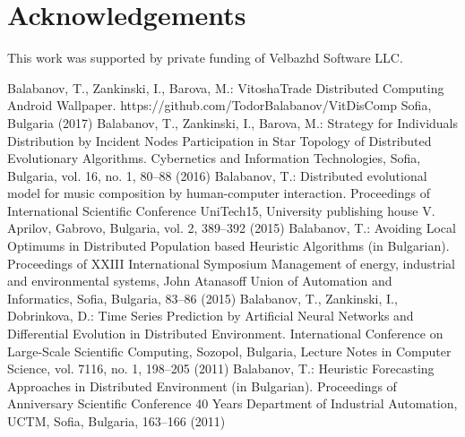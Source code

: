 \documentclass{llncs}
\begin{document}
\section*{Acknowledgements}
%
This work was supported by private funding of Velbazhd Software LLC.
%
%
\begin{thebibliography}{}
%
Balabanov, T., Zankinski, I., Barova, M.:
VitoshaTrade Distributed Computing Android Wallpaper.
https://github.com/TodorBalabanov/VitDisComp Sofia, Bulgaria  (2017)
%
Balabanov, T., Zankinski, I., Barova, M.:
Strategy for Individuals Distribution by Incident Nodes Participation in Star Topology of Distributed Evolutionary Algorithms.
Cybernetics and Information Technologies, Sofia, Bulgaria, vol. 16, no. 1, 80--88  (2016)
%
Balabanov, T.:
Distributed evolutional model for music composition by human-computer interaction.
Proceedings of International Scientific Conference UniTech15, University publishing house V. Aprilov, Gabrovo, Bulgaria, vol. 2, 389--392 (2015)
%
Balabanov, T.:
Avoiding Local Optimums in Distributed Population based Heuristic Algorithms (in Bulgarian).
Proceedings of XXIII International Symposium Management of energy, industrial and environmental systems, John Atanasoff Union of Automation and Informatics, Sofia, Bulgaria, 83--86 (2015)
%
Balabanov, T., Zankinski, I., Dobrinkova, D.:
Time Series Prediction by Artificial Neural Networks and Differential Evolution in Distributed Environment.
International Conference on Large-Scale Scientific Computing, Sozopol, Bulgaria, Lecture Notes in Computer Science, vol. 7116, no. 1, 198--205  (2011)
%
Balabanov, T.:
Heuristic Forecasting Approaches in Distributed Environment (in Bulgarian).
Proceedings of Anniversary Scientific Conference 40 Years Department of Industrial Automation, UCTM, Sofia, Bulgaria, 163--166 (2011)
%
\end{thebibliography}
\end{document}
